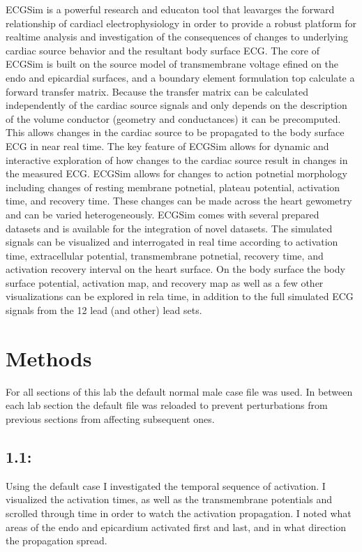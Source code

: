\documentclass[12pt]{article}
\begin{document}
ECGSim is a powerful research and educaton tool that leavarges the forward relationship of cardiacl electrophysiology in order to provide a robust platform for realtime analysis and investigation of the consequences of changes to underlying cardiac source behavior and the resultant body surface ECG. The core of ECGSim is built on the source model of transmembrane voltage efined on the endo and epicardial surfaces, and a boundary element formulation top calculate a forward transfer matrix. Because the transfer matrix can be calculated independently of the cardiac source signals and only depends on the description of the volume conductor (geometry and conductances) it can be precomputed. This allows changes in the cardiac source to be propagated to the body surface ECG in near real time. The key feature of ECGSim allows for dynamic and interactive exploration of how changes to the cardiac source result in changes in the measured ECG. ECGSim allows for changes to action potnetial morphology including changes of resting membrane potnetial, plateau potential, activation time, and recovery time. These changes can be made across the heart gewometry and can be varied heterogeneously. ECGSim comes with several prepared datasets and is available for the integration of novel datasets. The simulated signals can be visualized and interrogated in real time according to activation time, extracellular potential, transmembrane potnetial, recovery time, and activation recovery interval on the heart surface. On the body surface the body surface potential, activation map, and recovery map as well as a few other visualizations can be explored in rela time, in addition to the full simulated ECG signals from the 12 lead (and other) lead sets.

\section{Methods}
For all sections of this lab the default normal male case file was used. In between each lab section the default file was reloaded to prevent perturbations from previous sections from affecting subsequent ones.

\subsection{1.1: }
Using the default case I investigated the temporal sequence of activation. I visualized the activation times, as well as the transmembrane potentials and scrolled through time in order to watch the activation propagation. I noted what areas of the endo and epicardium activated first and last, and in what direction the propagation spread.
\end{document}
